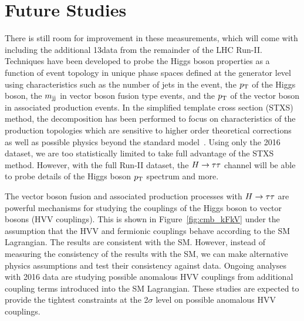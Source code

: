 \section{Future Studies}
There is still room for improvement in these measurements, which will come with
including the additional 13\TeV data from the remainder of the LHC Run-II. 
Techniques have been developed to probe the Higgs boson properties as a function
of event topology in unique phase spaces defined at the generator 
level using characteristics such as the number of jets
in the event, the $p_\mathrm{T}$ of the Higgs boson, the $m_\mathrm{jj}$ in vector boson
fusion type events, and the $p_\mathrm{T}$ of the
vector boson in associated production events. In the simplified template
cross section (STXS) method, the decomposition has been performed to focus on 
characteristics of the production topologies which are sensitive to higher
order theoretical corrections as well as possible physics beyond the standard
model~\cite{Tackmann:2138079}. Using only the 2016 dataset, we are too
statistically limited to take full advantage of the STXS method. However, with the
full Run-II dataset, the $H\to\tau\tau$ channel will be able to probe details of the
Higgs boson $p_\mathrm{T}$ spectrum and more.

The vector boson fusion and associated production processes with $H\to\tau\tau$ are 
powerful mechanisms for studying the couplings of the Higgs boson to vector bosons
(HVV couplings). This is shown in Figure~\ref{fig:cmb_kFkV} under the assumption
that the HVV and fermionic couplings behave according to the SM Lagrangian. 
The results are consistent with the SM.
However, instead of measuring the consistency of the results with the SM, we can make alternative
physics assumptions and test their consistency against data.
Ongoing analyses with 2016 data are studying possible
anomalous HVV couplings from additional coupling terms introduced into the SM Lagrangian. 
These studies are expected to provide the tightest constraints at the 2$\sigma$ 
level on possible anomalous HVV couplings.




